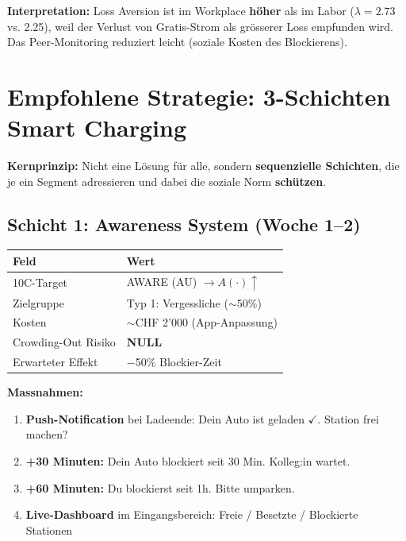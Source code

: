 \documentclass[11pt,a4paper]{article}
\begin{document}
\textbf{Interpretation:} Loss Aversion ist im Workplace \textbf{h\"oher} als im Labor ($\lambda = 2.73$ vs. 2.25), weil der Verlust von Gratis-Strom als gr\"osserer Loss empfunden wird. Das Peer-Monitoring reduziert leicht (soziale Kosten des Blockierens).


\section{Empfohlene Strategie: 3-Schichten Smart Charging}

\begin{recommendbox}
\textbf{Kernprinzip:} Nicht \guillemotleft eine L\"osung f\"ur alle\guillemotright, sondern \textbf{sequenzielle Schichten}, die je ein Segment adressieren und dabei die soziale Norm \textbf{sch\"utzen}.
\end{recommendbox}

\subsection{Schicht 1: Awareness System (Woche 1--2)}

\begin{table}[H]
\centering
\begin{tabular}{ll}
\toprule
\textbf{\color{fadarkblue}Feld} & \textbf{\color{fadarkblue}Wert} \\
\midrule
10C-Target & AWARE (AU) $\rightarrow A(\cdot)\uparrow$ \\
Zielgruppe & Typ 1: Vergessliche ($\sim$50\%) \\
Kosten & $\sim$CHF 2'000 (App-Anpassung) \\
Crowding-Out Risiko & \textcolor{famint}{\textbf{NULL}} \\
Erwarteter Effekt & $-$50\% Blockier-Zeit \\
\bottomrule
\end{tabular}
\end{table}

\textbf{Massnahmen:}
\begin{enumerate}[noitemsep]
\item \textbf{Push-Notification} bei Ladeende: \guillemotleft Dein Auto ist geladen $\checkmark$. Station frei machen?\guillemotright
\item \textbf{+30 Minuten:} \guillemotleft Dein Auto blockiert seit 30 Min. Kolleg:in wartet.\guillemotright
\item \textbf{+60 Minuten:} \guillemotleft Du blockierst seit 1h. Bitte umparken.\guillemotright
\item \textbf{Live-Dashboard} im Eingangsbereich: Freie / Besetzte / Blockierte Stationen
\end{enumerate}
\end{document}
